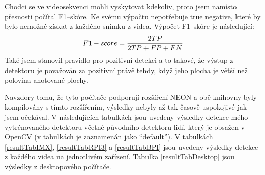 Chodci se ve videosekvenci mohli vyskytovat kdekoliv, proto jsem namísto přesnosti počítal F1--skóre. Ke svému výpočtu nepotřebuje true negative, které by bylo nemožné získat z každého snímku z videa. Výpočet F1--skóre je následující:
\begin{equation*}
\centering
 \label{eq:f1score}
 \begin{aligned}
F1-score = \frac{ 2TP}{2TP + FP + FN}
 \end{aligned}
\end{equation*}
Také jsem stanovil pravidlo pro pozitivní detekci a to takové, že výstup z detektoru je považován za pozitivní právě tehdy, když jeho plocha je větší než polovina anotované plochy. 

Navzdory tomu, že tyto počítače podporují rozšíření NEON a obě knihovny byly kompilovány s tímto rozšířením, výsledky nebyly až tak časově uspokojivé jak jsem očekával. V následujících tabulkách jsou uvedeny výsledky detekce mého vytrénovaného detektoru včetně původního detektoru lidí, který je obsažen v OpenCV (v tabulkách je zaznamenán jako ``default'').
V tabulkách \ref{resultTabIMX}, \ref{resultTabRPI3} a \ref{resultTabBPI} jsou uvedeny výsledky detekce z každého videa na jednotlivém zařízení. Tabulka \ref{resultTabDesktop} jsou výsledky z desktopového počítače.  

